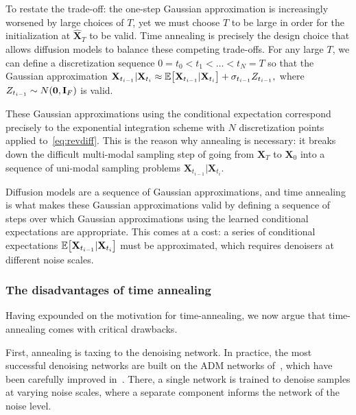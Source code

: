 To restate the trade-off: the one-step Gaussian approximation is increasingly worsened by large choices of $T$, yet we must choose $T$ to be large in order for the initialization at $\hat{\mathbf{X}}_T$ to be valid. Time annealing is precisely the design choice that allows diffusion models to balance these competing trade-offs. For any large $T$, we can define a discretization sequence $0 = t_0 < t_1 < \dots < t_N = T$ so that the Gaussian approximation $
\mathbf{X}_{t_{i-1}}|\mathbf{X}_{t_{i}} \approx \mathbb{E}\mathopen{}\left[\mathbf{X}_{t_{i-1}}|\mathbf{X}_{t_{i}}\right] + \sigma_{t_{i-1}} Z_{t_{i-1}},$
where $Z_{t_{i-1}} \sim N\mathopen{}\left(\mathbf{0}, \mathbf{I}_F\right)$ is valid. 

These Gaussian approximations using the conditional expectation correspond precisely to the exponential integration scheme with $N$ discretization points applied to~\ref{eq:revdiff}. This is the reason why annealing is necessary: it breaks down the difficult multi-modal sampling step of going from $\mathbf{X}_T$ to $\mathbf{X}_0$ into a sequence of uni-modal sampling problems $\mathbf{X}_{t_{i-1}}|\mathbf{X}_{t_i}$. 

Diffusion models are a sequence of Gaussian approximations, and time annealing is what makes these Gaussian approximations valid by defining a sequence of steps over which Gaussian approximations using the learned conditional expectations are appropriate. This comes at a cost: a series of conditional expectations $\mathbb{E}\mathopen{}\left[\mathbf{X}_{t_{i-1}}|\mathbf{X}_{t_{i}}\right]$ must be approximated, which requires denoisers at different noise scales.

\subsubsection{The disadvantages of time annealing}

Having expounded on the motivation for time-annealing, we now argue that time-annealing comes with critical drawbacks.

First, annealing is taxing to the denoising network. In practice, the most successful denoising networks are built on the ADM networks of~\cite{dhariwal_diffusion_2021}, which have been carefully improved in~\cite{karras_analyzing_2024}. There, a single network is trained to denoise samples at varying noise scales, where a separate component informs the network of the noise level.

